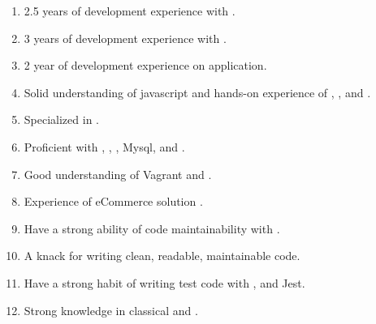  \begin{enumerate}[leftmargin=4ex, nosep, noitemsep]
    \item 2.5 years of development experience with .
    \item 3 years of development experience with .
    \item 2 year of development experience on  application.
    \item Solid understanding of javascript and hands-on experience of
        , ,  and .
    \item Specialized in .
    \item Proficient with , , , Mysql, and .
    \item Good understanding of Vagrant and .
    \item Experience of eCommerce solution .
    \item Have a strong ability of code maintainability with .
    \item A knack for writing clean, readable, maintainable code.
    \item Have a strong habit of writing test code with ,  and Jest.
    \item Strong knowledge in classical  and .
  \end{enumerate}

